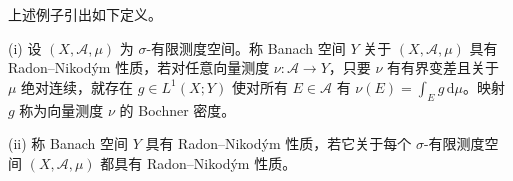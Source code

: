 \documentclass[../../main.tex]{subfiles}%
\begin{document}
上述例子引出如下定义。

\begin{definition}\label{definition:ch04-RNP}
(i) 设 $(X,\mathcal{A},\mu)$ 为 $\sigma$-有限测度空间。称 Banach 空间 $Y$ 关于 $(X,\mathcal{A},\mu)$ 具有 Radon--Nikodým 性质，若对任意向量测度 $\nu:\mathcal{A}\to Y$，只要 $\nu$ 有有界变差且关于 $\mu$ 绝对连续，就存在 $g\in L^1(X;Y)$ 使对所有 $E\in\mathcal{A}$ 有 $\nu(E)=\int_E g\,\mathrm{d}\mu$。映射 $g$ 称为向量测度 $\nu$ 的 Bochner 密度。

(ii) 称 Banach 空间 $Y$ 具有 Radon--Nikodým 性质，若它关于每个 $\sigma$-有限测度空间 $(X,\mathcal{A},\mu)$ 都具有 Radon--Nikodým 性质。
\end{definition}

\end{document}
